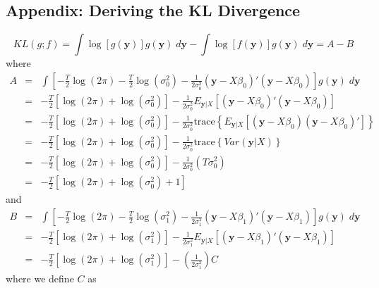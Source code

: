 \subsection{Appendix: Deriving the KL Divergence}
\label{sec:KLderivation}
  $$KL(g;f)= \int \log[g(\mathbf{y})] g(\mathbf{y}) \; d \mathbf{y} - \int \log[f(\mathbf{y})]g(\mathbf{y}) \; d \mathbf{y} = A - B$$
where
\begin{eqnarray*}
A &=&\int \left[-\frac{T}{2}\log(2\pi) -\frac{T}{2} \log(\sigma^2_0) - \frac{1}{2\sigma_0^2}\left(\textbf{y} - X\beta_0\right)'\left(\textbf{y} -X\beta_0\right) \right] g(\mathbf{y})\; d\mathbf{y}\\
&=& -\frac{T}{2}\left[ \log(2\pi) + \log(\sigma^2_0)\right] - \frac{1}{2\sigma_0^2} E_{\mathbf{y}|X}\left[\left(\textbf{y} - X\beta_0\right)'\left(\textbf{y} -X\beta_0\right)\right]\\
&=& -\frac{T}{2}\left[ \log(2\pi) + \log(\sigma^2_0)\right] - \frac{1}{2\sigma_0^2}\mbox{trace}\left\{ E_{\mathbf{y}|X}\left[\left(\textbf{y} - X\beta_0\right)\left(\textbf{y} -X\beta_0\right)'\right]\right\}\\
&=& -\frac{T}{2}\left[ \log(2\pi) + \log(\sigma^2_0)\right] - \frac{1}{2\sigma_0^2}\mbox{trace}\left\{ Var(\mathbf{y}|X)\right\}\\
&=& -\frac{T}{2}\left[ \log(2\pi) + \log(\sigma^2_0)\right] - \frac{1}{2\sigma_0^2}\left(T \sigma_0^2\right)\\
&=& -\frac{T}{2}\left[ \log(2\pi) + \log(\sigma^2_0) + 1 \right]
\end{eqnarray*}
and
\begin{eqnarray*}
B &=& \int \left[ -\frac{T}{2}\log(2\pi) -\frac{T}{2} \log(\sigma^2_1) - \frac{1}{2\sigma_1^2}\left(\textbf{y} - X\beta_1\right)'\left(\textbf{y} -X\beta_1\right) \right] g(\mathbf{y})\; d \mathbf{y}\\
&=& -\frac{T}{2}\left[\log(2\pi) + \log(\sigma^2_1) \right]- \frac{1}{2\sigma_1^2}E_{\mathbf{y}|X}\left[\left(\textbf{y} - X\beta_1\right)'\left(\textbf{y} -X\beta_1\right)\right]\\
&=& -\frac{T}{2}\left[\log(2\pi) + \log(\sigma^2_1) \right] - \left(\frac{1}{2\sigma_1^2}\right)C
\end{eqnarray*}
where we define $C$ as
